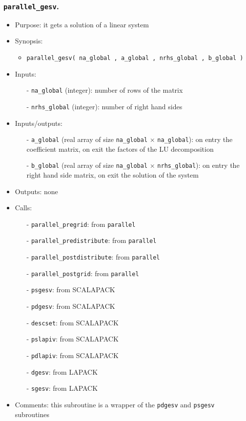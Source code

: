 \documentclass[12pt]{article}
\begin{document}
\subsubsection{{\tt parallel\_gesv}.}
\begin{itemize}
\item Purpose: it gets a solution of a linear system
\item Synopsis: 
\begin{itemize}
\item {\tt parallel\_gesv( na\_global , a\_global , nrhs\_global , b\_global )}
\end{itemize}
\item Inputs: 
\begin{itemize}
\item[-] {\tt na\_global} (integer): number of rows of the matrix
\item[-] {\tt nrhs\_global} (integer): number of right hand sides
\end{itemize}
\item Inputs/outputs: 
\begin{itemize}
\item[-] {\tt a\_global} (real array of size {\tt na\_global} $\times$ {\tt na\_global}): on entry the coefficient matrix, on exit the factors of the LU decomposition 
\item[-] {\tt b\_global} (real array of size {\tt na\_global} $\times$ {\tt nrhs\_global}): on entry the right hand side matrix, on exit the solution of the system
\end{itemize}
\item Outputs: none
\item Calls: 
\begin{itemize}
\item[-] {\tt parallel\_pregrid}: from {\tt parallel}
\item[-] {\tt parallel\_predistribute}: from {\tt parallel}
\item[-] {\tt parallel\_postdistribute}: from {\tt parallel}
\item[-] {\tt parallel\_postgrid}: from {\tt parallel}
\item[-] {\tt psgesv}: from SCALAPACK
\item[-] {\tt pdgesv}: from SCALAPACK
\item[-] {\tt descset}: from SCALAPACK
\item[-] {\tt pslapiv}: from SCALAPACK
\item[-] {\tt pdlapiv}: from SCALAPACK
\item[-] {\tt dgesv}: from LAPACK
\item[-] {\tt sgesv}: from LAPACK
\end{itemize}
\item Comments: this subroutine is a wrapper of the {\tt pdgesv} and {\tt psgesv} subroutines
\end{itemize} 
\end{document}
